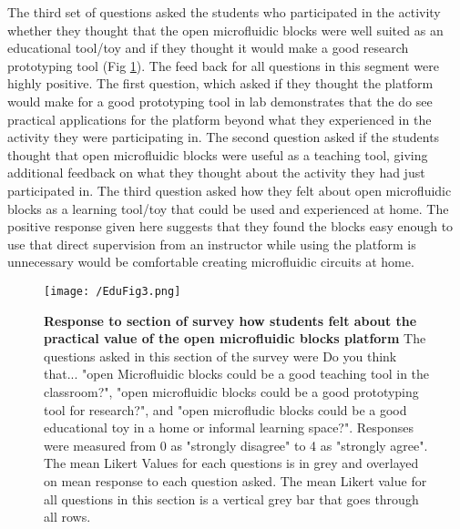 The third set of questions asked the students who participated in the activity whether they thought that the open microfluidic blocks were well suited as an educational tool/toy and if they thought it would make a good research prototyping tool (Fig \ref{figure:EduFig3}). The feed back for all questions in this segment were highly positive. The first question, which asked if they thought the platform would make for a good prototyping tool in lab demonstrates that the do see practical applications for the platform beyond what they experienced in the activity they were participating in. The second question asked if the students thought that open microfluidic blocks were useful as a teaching tool, giving additional feedback on what they thought about the activity they had just participated in. The third question asked how they felt about open microfluidic blocks as a learning tool/toy that could be used and experienced at home. The positive response given here suggests that they found the blocks easy enough to use that direct supervision from an instructor while using the platform is unnecessary would be comfortable creating microfluidic circuits at home.

\begin{figure}[h!] %
\centering
\texttt{[image: /EduFig3.png]}
\caption[\textbf{Response to section of survey how students felt about the practical value of the open microfluidic blocks platform}]{\textbf{Response to section of survey how students felt about the practical value of the open microfluidic blocks platform} The questions asked in this section of the survey were Do you think that... "open Microfluidic blocks could be a good teaching tool in the classroom?", "open microfluidic blocks could be a good prototyping tool for research?", and "open microfludic blocks could be a good educational toy in a home or informal learning space?". Responses were measured from 0 as "strongly disagree" to 4 as "strongly agree". The mean Likert Values for each questions is in grey and overlayed on mean response to each question asked. The mean Likert value for all questions in this section is a vertical grey bar that goes through all rows.}
\label{figure:EduFig3}
\end{figure}

